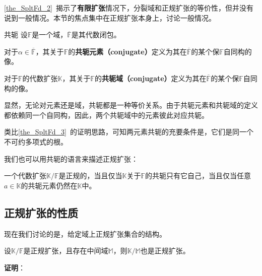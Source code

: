 

\autoref{the_SpltFd_2}~揭示了\textbf{有限扩张}情况下，分裂域和正规扩张的等价性，但并没有说到一般情况。本节的焦点集中在正规扩张本身上，讨论一般情况。


\begin{definition}{共轭}\label{def_NomEx_1}
设$\mathbb{F}$是一个域，$\overline{\mathbb{F}}$是其代数闭包。

对于$\alpha\in\overline{\mathbb{F}}$，其关于$\mathbb{F}$的\textbf{共轭元素（conjugate）}定义为其在$\overline{\mathbb{F}}$的某个保$\mathbb{F}$自同构的像。

对于$\mathbb{F}$的代数扩张$\mathbb{K}$，其关于$\mathbb{F}$的\textbf{共轭域（conjugate）}定义为其在$\overline{\mathbb{F}}$的某个保$\mathbb{F}$自同构的像。
\end{definition}

显然，无论对元素还是域，共轭都是一种等价关系。由于共轭元素和共轭域的定义都依赖同一个自同构，因此，两个共轭域中的元素彼此对应共轭。

类比\autoref{the_SpltFd_3}~的证明思路，可知两元素共轭的充要条件是，它们是同一个不可约多项式的根。

我们也可以用共轭的语言来描述正规扩张：

\begin{theorem}{}\label{the_NomEx_1}
一个代数扩张$\mathbb{K}/\mathbb{F}$是正规的，当且仅当$\mathbb{K}$关于$\mathbb{F}$的共轭只有它自己，当且仅当任意$a\in\mathbb{K}$的共轭元素仍然在$\mathbb{K}$中。
\end{theorem}



\subsection{正规扩张的性质}

现在我们讨论的是，给定域上正规扩张集合的结构。

\begin{theorem}{}\label{the_NomEx_6}
设$\mathbb{K}/\mathbb{F}$是正规扩张，且存在中间域$\mathbb{M}$，则$\mathbb{K}/\mathbb{M}$也是正规扩张。
\end{theorem}

\textbf{证明}：



